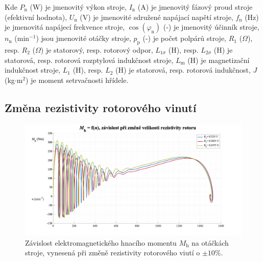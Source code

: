 \documentclass[a4paper, twoside, 11pt]{article}
\newcommand{\fbar}{\FloatBarrier}
\begin{document}
        \vspace*{1cm}
Kde $P_\text{n}$ (W) je jmenovitý výkon stroje, $I_\text{n}$ (A) je jmenovitý fázový proud stroje (efektivní hodnota), $U_\text{n}$ (V) je jmenovité sdružené napájací napětí stroje, $f_\text{n}$ (Hz) je jmenovitá napájecí frekvence stroje, $\cos(\varphi_\text{n})$ (-) je jmenovitý účinník stroje, $n_\text{n}$ (min$^{-1}$) jsou jmenovité otáčky stroje, $p_\text{p}$ (-) je počet polpárů stroje, $R_1$ ($\Omega$), resp. $R_2$ ($\Omega$) je statorový, resp. rotorový odpor, $L_{1\sigma}$ (H), resp. $L_{2\sigma}$ (H) je statorová, resp. rotorová rozptylová  indukčnost stroje, $L_\text{m}$ (H) je magnetizační indukčnost stroje, $L_1$ (H), resp. $L_2$ (H) je statorová, resp. rotorová indukčnost, $J$ (kg$\cdot$m$^{2}$) je moment setrvačnosti hřídele.\par


    \subsection{Změna rezistivity rotorového vinutí}
        \begin{figure}[htbp!]
            \centering
            \includegraphics[width=1\textwidth]{src/png/mh_dyn_nGraphR2.png}
            \caption{Závislost elektromagnetického hnacího momentu $M_\text{h}$ na otáčkách stroje, vynesená při změně rezistivity rotorového viutí o $\pm 10 \%$.}
            \label{fig:mh_dyn_nGraphR2}
        \end{figure}

    \fbar
\end{document}

